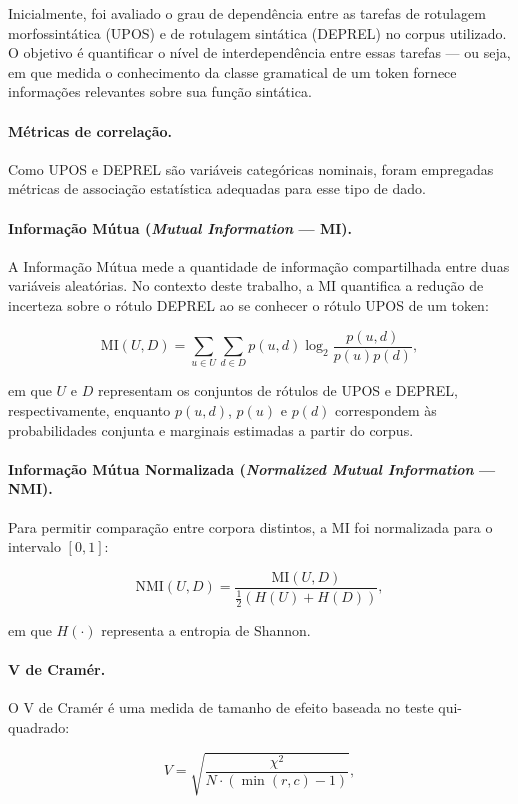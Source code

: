 Inicialmente, foi avaliado o grau de dependência entre as tarefas de rotulagem morfossintática
(UPOS) e de rotulagem sintática (DEPREL) no corpus utilizado. O objetivo é quantificar o
nível de interdependência entre essas tarefas — ou seja, em que medida o conhecimento da
classe gramatical de um token fornece informações relevantes sobre sua função sintática.

\paragraph{Métricas de correlação.}
Como UPOS e DEPREL são variáveis categóricas nominais, foram empregadas métricas de associação
estatística adequadas para esse tipo de dado.

\paragraph{Informação Mútua (\textit{Mutual Information} — MI).}
A Informação Mútua mede a quantidade de informação compartilhada entre duas variáveis
aleatórias. No contexto deste trabalho, a MI quantifica a redução de incerteza sobre o rótulo
DEPREL ao se conhecer o rótulo UPOS de um token:

\[
\mathrm{MI}(U, D) =
\sum_{u \in U}\sum_{d \in D}
p(u,d)\log_2\frac{p(u,d)}{p(u)p(d)},
\]

em que $U$ e $D$ representam os conjuntos de rótulos de UPOS e DEPREL, respectivamente,
enquanto $p(u,d)$, $p(u)$ e $p(d)$ correspondem às probabilidades conjunta e marginais
estimadas a partir do corpus.

\paragraph{Informação Mútua Normalizada (\textit{Normalized Mutual Information} — NMI).}
Para permitir comparação entre corpora distintos, a MI foi normalizada para o intervalo
$[0,1]$:

\[
\mathrm{NMI}(U, D) =
\frac{\mathrm{MI}(U, D)}
{\frac{1}{2}(H(U)+H(D))},
\]

em que $H(\cdot)$ representa a entropia de Shannon.

\paragraph{V de Cramér.}
O V de Cramér é uma medida de tamanho de efeito baseada no teste qui-quadrado:

\[
V =
\sqrt{
\frac{\chi^2}
{N \cdot (\min(r,c)-1)}
},
\]

